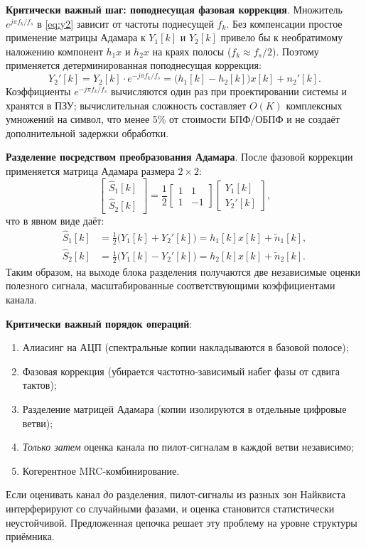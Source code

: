 \documentclass[a4paper,12pt]{article}
\numberwithin{equation}{section}
\begin{document}
\textbf{Критически важный шаг: поподнесущая фазовая коррекция}. Множитель $e^{j\pi f_k / f_s}$ в \eqref{eq:y2} зависит от частоты поднесущей $f_k$. Без компенсации простое применение матрицы Адамара к $Y_1[k]$ и $Y_2[k]$ привело бы к необратимому наложению компонент $h_1 x$ и $h_2 x$ на краях полосы ($f_k \approx f_s/2$). Поэтому применяется детерминированная поподнесущая коррекция:
\begin{equation}
    Y_2'[k] = Y_2[k] \cdot e^{-j\pi f_k / f_s} = \bigl(h_1[k] - h_2[k]\bigr) x[k] + n_2'[k].
    \label{eq:y2corr}
\end{equation}
Коэффициенты $e^{-j\pi f_k / f_s}$ вычисляются один раз при проектировании системы и хранятся в ПЗУ; вычислительная сложность составляет $O(K)$ комплексных умножений на символ, что менее 5\% от стоимости БПФ/ОБПФ и не создаёт дополнительной задержки обработки.

\textbf{Разделение посредством преобразования Адамара}. После фазовой коррекции применяется матрица Адамара размера $2\times2$:
\begin{equation}
    \begin{bmatrix} \hat{S}_1[k] \\ \hat{S}_2[k] \end{bmatrix} = 
    \frac{1}{2} 
    \begin{bmatrix} 1 & 1 \\ 1 & -1 \end{bmatrix}
    \begin{bmatrix} Y_1[k] \\ Y_2'[k] \end{bmatrix},
    \label{eq:hadamard}
\end{equation}
что в явном виде даёт:
\begin{align}
    \hat{S}_1[k] &= \frac{1}{2}\bigl(Y_1[k] + Y_2'[k]\bigr) = h_1[k] x[k] + \tilde{n}_1[k], \label{eq:s1} \\
    \hat{S}_2[k] &= \frac{1}{2}\bigl(Y_1[k] - Y_2'[k]\bigr) = h_2[k] x[k] + \tilde{n}_2[k]. \label{eq:s2}
\end{align}
Таким образом, на выходе блока разделения получаются две независимые оценки полезного сигнала, масштабированные соответствующими коэффициентами канала.

\textbf{Критически важный порядок операций}:
\begin{enumerate}
    \item Алиасинг на АЦП (спектральные копии накладываются в базовой полосе);
    \item Фазовая коррекция (убирается частотно-зависимый набег фазы от сдвига тактов);
    \item Разделение матрицей Адамара (копии изолируются в отдельные цифровые ветви);
    \item \textit{Только затем} оценка канала по пилот-сигналам в каждой ветви независимо;
    \item Когерентное MRC-комбинирование.
\end{enumerate}
Если оценивать канал \textit{до} разделения, пилот-сигналы из разных зон Найквиста интерферируют со случайными фазами, и оценка становится статистически неустойчивой. Предложенная цепочка решает эту проблему на уровне структуры приёмника.
\end{document}
